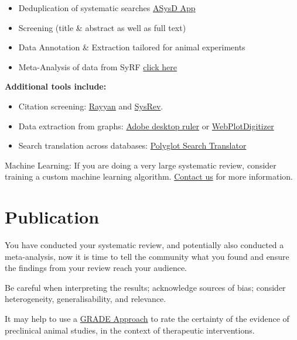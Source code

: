 \documentclass[
]{book}
\begin{document}
\begin{itemize}
\item
  Deduplication of systematic searches \href{https://camarades.shinyapps.io/RDedup/}{ASysD App}
\item
  Screening (title \& abstract as well as full text)
\item
  Data Annotation \& Extraction tailored for animal experiments
\item
  Meta-Analysis of data from SyRF \href{https://camarades.shinyapps.io/meta-analysis-app/}{click here}
\end{itemize}

\textbf{Additional tools include:}

\begin{itemize}
\item
  Citation screening: \href{https://rayyan.qcri.org/welcome}{Rayyan} and \href{https://sysrev.com/}{SysRev}.
\item
  Data extraction from graphs: \href{https://helpx.adobe.com/acrobat/using/grids-guides-measurements-pdfs.html}{Adobe desktop ruler} or \href{https://automeris.io/WebPlotDigitizer/}{WebPlotDigitizer}
\item
  Search translation across databases: \href{https://sr-accelerator.com/\#/polyglot}{Polyglot Search Translator}
\end{itemize}

Machine Learning:
If you are doing a very large systematic review, consider training a custom machine learning algorithm. \href{mailto:camarades.berlin@charite.de}{Contact us} for more information.

\hypertarget{publication}{%
\chapter{Publication}\label{publication}}

You have conducted your systematic review, and potentially also conducted a meta-analysis, now it is time to tell the community what you found and ensure the findings from your review reach your audience.

Be careful when interpreting the results; acknowledge sources of bias; consider heterogeneity, generalisability, and relevance.

It may help to use a \href{https://journals.plos.org/plosone/article?id=10.1371/journal.pone.0187271}{GRADE Approach} to rate the certainty of the evidence of preclinical animal studies, in the context of therapeutic interventions.
\end{document}
